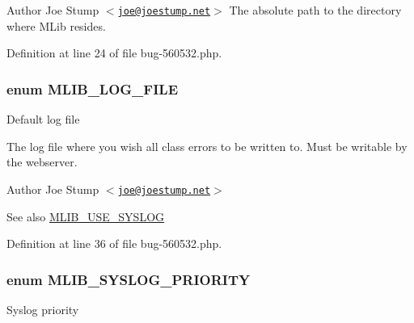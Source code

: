 \begin{DoxyAuthor}{\-Author}
\-Joe \-Stump $<$\href{mailto:joe@joestump.net}{\tt joe@joestump.\-net}$>$ \-The absolute path to the directory where \-M\-Lib resides. 
\end{DoxyAuthor}


\-Definition at line 24 of file bug-\/560532.\-php.

\hypertarget{bug-560532_8php_ae6ff542323c614333b346e035a1700c7}{
\subsubsection[{\-M\-L\-I\-B\-\_\-\-L\-O\-G\-\_\-\-F\-I\-L\-E}]{\setlength{\rightskip}{0pt plus 5cm}enum {\bf \-M\-L\-I\-B\-\_\-\-L\-O\-G\-\_\-\-F\-I\-L\-E}}}\label{bug-560532_8php_ae6ff542323c614333b346e035a1700c7}
\-Default log file

\-The log file where you wish all class errors to be written to. \-Must be writable by the webserver.

\begin{DoxyAuthor}{\-Author}
\-Joe \-Stump $<$\href{mailto:joe@joestump.net}{\tt joe@joestump.\-net}$>$ 
\end{DoxyAuthor}
\begin{DoxySeeAlso}{\-See also}
\hyperlink{bug-560532_8php_a02a03d86327e82cba1f4db2402f6dc30}{\-M\-L\-I\-B\-\_\-\-U\-S\-E\-\_\-\-S\-Y\-S\-L\-O\-G} 
\end{DoxySeeAlso}


\-Definition at line 36 of file bug-\/560532.\-php.

\hypertarget{bug-560532_8php_a9e03617702faed4e255489358b73794a}{
\subsubsection[{\-M\-L\-I\-B\-\_\-\-S\-Y\-S\-L\-O\-G\-\_\-\-P\-R\-I\-O\-R\-I\-T\-Y}]{\setlength{\rightskip}{0pt plus 5cm}enum {\bf \-M\-L\-I\-B\-\_\-\-S\-Y\-S\-L\-O\-G\-\_\-\-P\-R\-I\-O\-R\-I\-T\-Y}}}\label{bug-560532_8php_a9e03617702faed4e255489358b73794a}
\-Syslog priority

